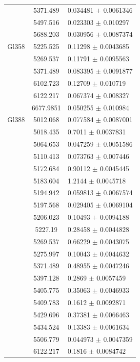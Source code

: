 \begin{longtable}{|c|c|l|}
 & 5371.489 & 0.034481 $\pm$ 0.0061346 \\       
 & 5497.516 & 0.023303 $\pm$ 0.010297 \\        
 & 5688.203 & 0.030956 $\pm$ 0.0087374 \\       
\hline                                          
Gl358 & 5225.525 & 0.11298 $\pm$ 0.0043685 \\   
 & 5269.537 & 0.11791 $\pm$ 0.0095563 \\        
 & 5371.489 & 0.083395 $\pm$ 0.0091877 \\       
 & 6102.723 & 0.12709 $\pm$ 0.010719 \\         
 & 6122.217 & 0.067374 $\pm$ 0.008327 \\        
 & 6677.9851 & 0.050255 $\pm$ 0.010984 \\       
\hline                                          
Gl388 & 5012.068 & 0.077584 $\pm$ 0.0087001 \\  
 & 5018.435 & 0.7011 $\pm$ 0.0037831 \\         
 & 5064.653 & 0.047259 $\pm$ 0.0051586 \\       
 & 5110.413 & 0.073763 $\pm$ 0.007446 \\        
 & 5172.684 & 0.90112 $\pm$ 0.0045445 \\        
 & 5183.604 & 1.2144 $\pm$ 0.0045718 \\         
 & 5194.942 & 0.059813 $\pm$ 0.0067574 \\       
 & 5197.568 & 0.029405 $\pm$ 0.0069104 \\       
 & 5206.023 & 0.10493 $\pm$ 0.0094188 \\        
 & 5227.19 & 0.28458 $\pm$ 0.0044828 \\         
 & 5269.537 & 0.66229 $\pm$ 0.0043075 \\        
 & 5275.997 & 0.10043 $\pm$ 0.0044632 \\        
 & 5371.489 & 0.48955 $\pm$ 0.0047246 \\        
 & 5397.128 & 0.2869 $\pm$ 0.0057459 \\         
 & 5405.775 & 0.35063 $\pm$ 0.0046933 \\        
 & 5409.783 & 0.1612 $\pm$ 0.0092871 \\         
 & 5429.696 & 0.37381 $\pm$ 0.0066463 \\        
 & 5434.524 & 0.13383 $\pm$ 0.0061634 \\        
 & 5506.779 & 0.044973 $\pm$ 0.0047359 \\       
 & 6122.217 & 0.1816 $\pm$ 0.0084742 \\         

\end{longtable}
